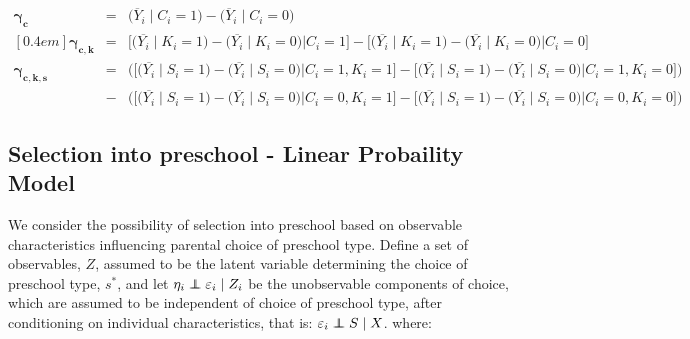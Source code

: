 \documentclass[10pt]{article}
\newcommand\independent{\protect\mathpalette{\protect\independenT}{\perp}}
\def\independenT#1#2{\mathrel{\rlap{$#1#2$}\mkern2mu{#1#2}}}
\begin{document}
\begin{eqnarray*}  
\boldsymbol{\gamma_c} & = &  \Big(\overline{Y}_i \mid C_i = 1\Big) - \Big(\overline{Y}_i \mid C_i = 0\Big) & \\ [0.4em]
\boldsymbol{\gamma_{c,k}} & = & \Bigg[\Big(\overline{Y_i} \mid K_i = 1\Big) - \Big(\overline{Y_i} \mid K_i = 0\Big) \Big| C_i =1 \Bigg] - \Bigg[\Big(\overline{Y_i} \mid K_i = 1) - \Big(\overline{Y_i} \mid K_i = 0\Big) \Big| C_i = 0 \Bigg] & \\[0.6em]
\boldsymbol{\gamma_{c,k,s}} & = & \Bigg(\Big[\Big(\overline{Y_i} \mid S_i = 1\Big) - \Big(\overline{Y_i} \mid S_i = 0\Big)\Big| C_i =1, K_i = 1 \Big] - \Big[\Big(\overline{Y_i} \mid S_i = 1\Big) - \Big(\overline{Y_i} \mid S_i = 0\Big)\Big| C_i =1, K_i = 0 \Big]\Bigg)  &\\
&  - & \Bigg(\Big[\Big(\overline{Y_i} \mid S_i = 1\Big) - \Big(\overline{Y_i} \mid S_i = 0\Big)\Big| C_i =0, K_i = 1 \Big] - \Big[\Big(\overline{Y_i} \mid S_i = 1\Big) - \Big(\overline{Y_i} \mid S_i = 0\Big)\Big| C_i =0, K_i = 0 \Big]\Bigg) &
\end{eqnarray*}

\subsection{Selection into preschool - Linear Probaility Model}

We consider the possibility of selection into preschool based on observable characteristics influencing parental choice of preschool type.  Define a set of observables, $Z$, assumed to be the latent variable determining the choice of preschool type, $s^{*}$, and let $\eta_i \independent \varepsilon_{i} \mid Z_i$ be the unobservable components of choice, which are assumed to be independent of choice of preschool type, after conditioning on individual characteristics, that is: $\varepsilon_{i} \independent S \mid X$.  where:
\end{document}
